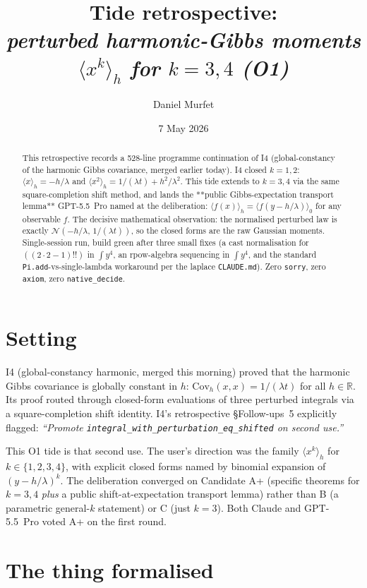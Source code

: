 \documentclass[11pt]{article}
\title{Tide retrospective:\\\emph{perturbed harmonic-Gibbs moments
$\langle x^k\rangle_h$ for $k = 3, 4$ (O1)}}
\author{Daniel Murfet}
\date{7 May 2026}
\begin{document}
\maketitle

\begin{abstract}
This retrospective records a 528-line programme continuation of I4
(global-constancy of the harmonic Gibbs covariance, merged earlier
today). I4 closed $k = 1, 2$: $\langle x\rangle_h = -h/\lambda$ and
$\langle x^2\rangle_h = 1/(\lambda t) + h^2/\lambda^2$. This tide
extends to $k = 3, 4$ via the same square-completion shift method,
and lands the **public Gibbs-expectation transport lemma** GPT-5.5~Pro
named at the deliberation: $\langle f(x)\rangle_h = \langle
f(y - h/\lambda)\rangle_0$ for any observable $f$. The decisive
mathematical observation: the normalised perturbed law is exactly
$\mathcal N(-h/\lambda,\,1/(\lambda t))$, so the closed forms are
the raw Gaussian moments. Single-session run, build green after three
small fixes (a cast normalisation for $((2\!\cdot\!2-1)!!)$ in
$\int y^4$, an rpow-algebra sequencing in $\int y^4$, and the standard
\texttt{Pi.add}-vs-single-lambda workaround per the laplace
\texttt{CLAUDE.md}). Zero \texttt{sorry}, zero \texttt{axiom},
zero \texttt{native\_decide}.
\end{abstract}

\section{Setting}

I4 (global-constancy harmonic, merged this morning) proved that the
harmonic Gibbs covariance is globally constant in $h$:
$\mathrm{Cov}_h(x, x) = 1/(\lambda t)$ for all $h \in \mathbb R$. Its
proof routed through closed-form evaluations of three perturbed
integrals via a square-completion shift identity. I4's retrospective
\S Follow-ups~5 explicitly flagged: \emph{``Promote
\texttt{integral\_with\_perturbation\_eq\_shifted} on second use.''}

This O1 tide is that second use. The user's direction was the family
$\langle x^k\rangle_h$ for $k \in \{1, 2, 3, 4\}$, with explicit
closed forms named by binomial expansion of $(y - h/\lambda)^k$. The
deliberation converged on Candidate A+ (specific theorems for
$k = 3, 4$ \emph{plus} a public shift-at-expectation transport lemma)
rather than B (a parametric general-$k$ statement) or C (just $k = 3$).
Both Claude and GPT-5.5~Pro voted A+ on the first round.

\section{The thing formalised}
\end{document}
